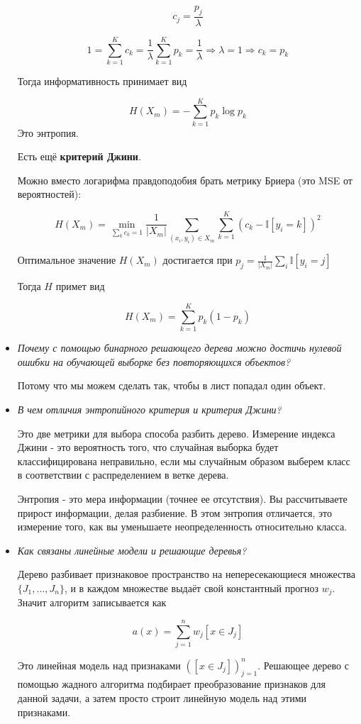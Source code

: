 \documentclass[12pt]{article}
\begin{document}
\begin{itemize}
\[ c_j = \frac{p_j}{\lambda} \]

\[ 1 = \sum_{k=1}^K c_k = \frac{1}{\lambda} \sum_{k=1}^K p_k = \frac{1}{\lambda} \Rightarrow \lambda = 1 \Rightarrow c_k = p_k \]

Тогда информативность принимает вид 

\[ H(X_m) = - \sum_{k=1}^K p_k \log p_k \]
Это энтропия.

Есть ещё \textbf{критерий Джини}.

Можно вместо логарифма правдоподобия брать метрику Бриера (это MSE от вероятностей):

\[ H(X_m) = \min_{\sum_k c_k = 1} \frac{1}{|X_m|} \sum_{(x_i, y_i) \in X_m} \sum_{k=1}^K ( c_k - \mathbb{I}[y_i=k] )^2 \]

Оптимальное значение $H(X_m)$ достигается при $p_j = \frac{1}{|X_m|} \sum_i \mathbb{I} [y_i = j]$

Тогда $H$ примет вид 

\[ H(X_m) = \sum_{k=1}^K p_k (1-p_k) \]

\item \textit{Почему с помощью бинарного решающего дерева можно достичь нулевой ошибки на обучающей выборке без повторяющихся объектов?}

Потому что мы можем сделать так, чтобы в лист попадал один объект.

\item \textit{В чем отличия энтропийного критерия и критерия Джини?}

Это две метрики для выбора способа разбить дерево. Измерение индекса Джини - это вероятность того, что случайная выборка будет классифицирована неправильно, если мы случайным образом выберем класс в соответствии с распределением в ветке дерева.

Энтропия - это мера информации (точнее ее отсутствия). Вы рассчитываете прирост информации, делая разбиение. В этом энтропия отличается, это измерение того, как вы уменьшаете неопределенность относительно класса.


\item \textit{Как связаны линейные модели и решающие деревья?}

Дерево разбивает признаковое пространство на непересекающиеся множества $\{ J_1, ..., J_n \}$,  и в каждом множестве выдаёт свой константный прогноз $w_j$. Значит алгоритм записывается как 

\[ a(x) = \sum_{j=1}^n w_j [x \in J_j] \]

Это линейная модель над признаками $([x \in J_j])_{j=1}^n$. Решающее
дерево с помощью жадного алгоритма подбирает преобразование признаков для данной задачи, а затем просто строит линейную модель над этими признаками.


\end{itemize}
\end{document}
